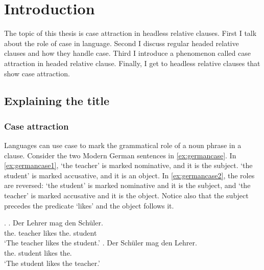 
\chapter{Introduction}

The topic of this thesis is case attraction in headless relative clauses. First I talk about the role of case in language. Second I discuss regular headed relative clauses and how they handle case. Third I introduce a phenomenon called case attraction in headed relative clause. Finally, I get to headless relative clauses that show case attraction.


\section{Explaining the title}


\subsection{Case attraction}

Languages can use case to mark the grammatical role of a noun phrase in a clause. Consider the two Modern German sentences in \ref{ex:germancase}. In \ref{ex:germancase1},  `the teacher' is marked nominative, and it is the subject.  `the student' is marked accusative, and it is an object. In \ref{ex:germancase2}, the roles are reversed:  `the student' is marked nominative and it is the subject, and  `the teacher' is marked accusative and it is the object. Notice also that the subject precedes the predicate  `likes' and the object follows it.

\ex.\label{ex:germancase}
\ag. Der Lehrer mag den Schüler.\\
 the. teacher likes the. student\\
 `The teacher likes the student.'\label{ex:germancase1}
\bg. Der Schüler mag den Lehrer.\\
 the. student likes the.\\
 `The student likes the teacher.'\label{ex:germancase2}

